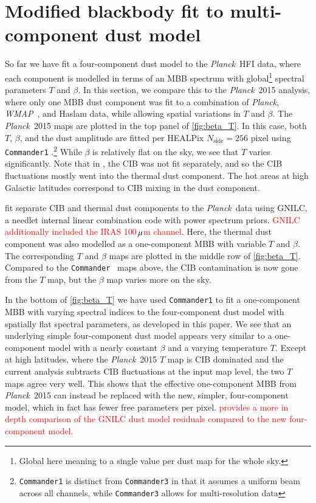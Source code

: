 \documentclass{aa}
\def\Planck{\textit{Planck}}
\def\WMAP{\textit{WMAP}}
\def\Commander{\texttt{Commander} }
\def\commanderone{\texttt{Commander1} }
\def\,{\thinspace}
\newcommand{\edit}[1]{\textcolor{red}{#1}}
\begin{document}
\section{Modified blackbody fit to multi-component dust model}
\label{sec:mbb}

So far we have fit a four-component dust model to the \Planck\ HFI
data, where each component is modelled in terms of an MBB spectrum
with global\footnote{Global here meaning to a single value per dust map for the whole sky.} spectral parameters $T$ and $\beta$. In this section,
we compare this to the \Planck\ 2015 \citep{planck2014-a12} analysis,
where only one MBB dust component was fit to a combination of \Planck,
\WMAP\ \citep{bennett:2013}, and Haslam \citep{haslam1982} data, while
allowing spatial variations in $T$ and $\beta$. The \Planck\ 2015 maps
are plotted in the top panel of \cref{fig:beta_T}. In this case, both
$T$, $\beta$, and the dust amplitude are fitted per HEALPix
$N_{\mathrm{side}}=256$ pixel using \texttt{Commander1}
\citep{eriksen2008}.\footnote{\texttt{Commander1} is distinct from
\texttt{Commander3} in that it assumes a uniform beam across all
channels, while \texttt{Commander3} allows for multi-resolution data}
While $\beta$ is relatively flat on the sky, we see that $T$ varies
significantly. Note that in \citet{planck2014-a12}, the CIB was not
fit separately, and so the CIB fluctuations mostly went
into the thermal dust component. The hot areas at high Galactic
latitudes correspond to CIB mixing in the dust component.

\citet{planck2016-XLVIII} fit separate CIB and thermal dust
components to the \Planck\ data using GNILC, a needlet internal linear combination code with
power spectrum priors. \edit{GNILC additionally included the IRAS 100$\,\mu$m channel}. Here, the thermal dust component was also
modelled as a one-component MBB with variable $T$ and $\beta$. The corresponding $T$ and $\beta$ maps are plotted
in the middle row of \cref{fig:beta_T}. Compared to the \Commander\ maps
above, the CIB contamination is now gone from the $T$ map, but the $\beta$
map varies more on the sky.

In the bottom of \cref{fig:beta_T} we have used \commanderone to fit a
one-component MBB with varying spectral indices to the four-component dust
model with spatially flat spectral parameters, as developed in this
paper. We see that an underlying simple four-component dust model appears
very similar to a one-component model with a nearly constant $\beta$
and a varying temperature $T$. Except at high latitudes, where the
\Planck\ 2015 $T$ map is CIB dominated and the current analysis
subtracts CIB fluctuations at the input map level, the two $T$ maps
agree very well. This shows that the effective one-component MBB from
\Planck\ 2015 can instead be replaced with the new, simpler, four-component
model, which in fact has fewer free parameters per pixel. \edit{ provides a more in depth comparison of the GNILC dust model residuals compared to the new four-component model.}
\end{document}
